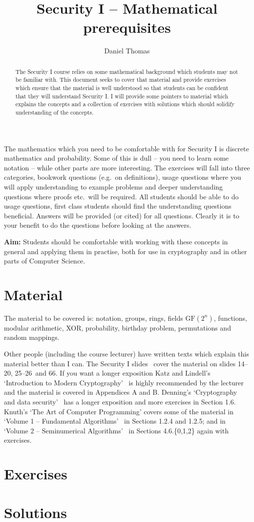 \documentclass[12pt,a4paper]{article}
\author{Daniel Thomas}
\title{Security I -- Mathematical prerequisites}
\newif\ifshowanswers
\newcommand{\slidesinitialmath}{14--20}
\newcommand{\slidesprobability}{25--26}
\newcommand{\slidesbirthday}{66}
\newcommand{\slidesall}{\slidesinitialmath, \slidesprobability\ and \slidesbirthday}
\begin{document}
\maketitle

\begin{abstract}
The Security I course relies on some mathematical background which students may not be familiar with.
This document seeks to cover that material and provide exercises which ensure that the material is well understood so that students can be confident that they will understand Security I.
I will provide some pointers to material which explains the concepts and a collection of exercises with solutions which should solidify understanding of the concepts.
\end{abstract}

The mathematics which you need to be comfortable with for Security I is discrete mathematics and probability.
Some of this is dull -- you need to learn some notation -- while other parts are more interesting.
The exercises will fall into three categories, bookwork questions (e.g.\ on definitions), usage questions where you will apply understanding to example problems and deeper understanding questions where proofs etc.\ will be required.
All students should be able to do usage questions, first class students should find the understanding questions beneficial.
Answers will be provided (or cited) for all questions.
Clearly it is to your benefit to do the questions before looking at the answers.

{\bf Aim:} Students should be comfortable with working with these concepts in general and applying them in practise, both for use in cryptography and in other parts of Computer Science.

\section*{Material}
The material to be covered is: notation, groups, rings, fields $\mathrm{GF}(2^n)$, functions, modular arithmetic, XOR, probability, birthday problem, permutations and random mappings.

Other people (including the course lecturer) have written texts which explain this material better than I can.
The Security I slides~\cite{SecurityISlides} cover the material on slides \slidesall.
If you want a longer exposition Katz and Lindell's `Introduction to Modern Cryptography'~\cite{Katz2008} is highly recommended by the lecturer and the material is covered in Appendices A and B.
Denning's `Cryptography and data security'~\cite{Denning1982} has a longer exposition and more exercises in Section 1.6.
Knuth's `The Art of Computer Programming' covers some of the material in `Volume 1 -- Fundamental Algorithms'~\cite{KnuthTAOCP1} in Sections 1.2.4 and 1.2.5; and in `Volume 2 -- Seminumerical Algorithms'~\cite{KnuthTAOCP2} in Sections 4.6.\{0,1,2\} again with exercises.

\section*{Exercises}
\showanswersfalse


\pagebreak

\section*{Solutions}
\showanswerstrue


\printbibliography
\end{document}
